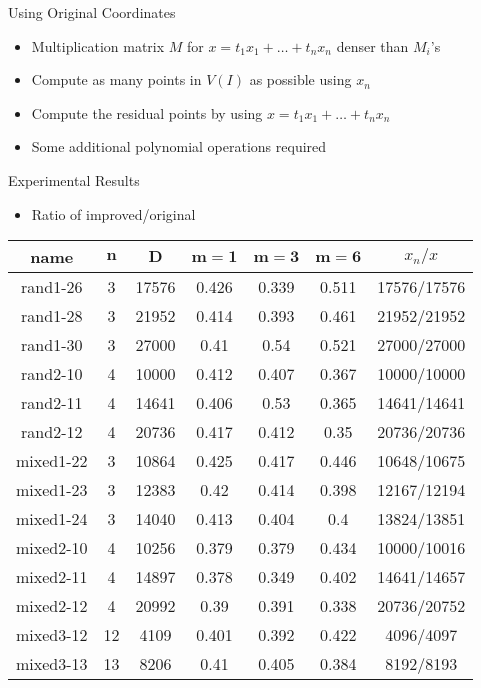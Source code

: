 \documentclass{beamer}
\begin{document}
\begin{frame}{Using Original Coordinates}
	\begin{itemize}
		\item Multiplication matrix $M$ for $x = t_1 x_1 + \dots + t_n x_n$ denser than $M_i$'s
		\item Compute as many points in $V(I)$ as possible using $x_n$
		\item Compute the residual points by using $x= t_1 x_1 + \dots + t_n x_n$
		\item Some additional polynomial operations required
	\end{itemize}
\end{frame}

\begin{frame}{Experimental Results}
	\begin{itemize}
		\item Ratio of improved/original
	\end{itemize}
	\begin{tabular}{c|c|c|c|c|c|c}
		\textbf{name}& $\bm{n}$ & $\bm{D}$ & $\bm{m = 1}$ & $\bm{m = 3}$ & $\bm{m = 6}$&$x_n/x$\\
		\hline
		rand1-26&3 &17576&0.426&0.339&0.511& 17576/17576\\
		rand1-28&3 &21952&0.414&0.393&0.461& 21952/21952\\
		rand1-30&3 &27000&0.41&0.54&0.521& 27000/27000\\
		rand2-10&4 &10000&0.412&0.407&0.367& 10000/10000\\
		rand2-11&4 &14641&0.406&0.53&0.365& 14641/14641\\
		rand2-12&4 &20736&0.417&0.412&0.35& 20736/20736\\
		mixed1-22&3 &10864&0.425&0.417&0.446& 10648/10675\\
		mixed1-23&3 &12383&0.42&0.414&0.398&  12167/12194\\
		mixed1-24&3 &14040&0.413&0.404&0.4&  13824/13851\\
		mixed2-10&4 &10256&0.379&0.379&0.434& 10000/10016 \\
		mixed2-11&4 &14897&0.378&0.349&0.402& 14641/14657\\
		mixed2-12&4 &20992&0.39&0.391&0.338& 20736/20752\\
		mixed3-12&12 &4109&0.401&0.392&0.422& 4096/4097\\
		mixed3-13&13&8206&0.41&0.405&0.384& 8192/8193
	\end{tabular}
\end{frame}
\end{document}

